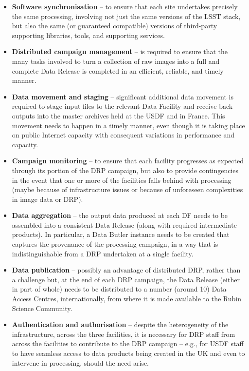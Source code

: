 \begin{itemize}

\item {\bf Software synchronisation} -- to ensure that each site undertakes precisely the same processing, involving not just the same versions of the LSST stack, but also the same (or guaranteed compatible) versions of third-party supporting libraries, tools, and supporting services.

\item {\bf Distributed campaign management} -- is required to ensure that the many tasks involved to turn a collection of raw images into a full and complete Data Release is completed in an efficient, reliable, and timely manner.

\item {\bf Data movement and staging} -- significant additional data movement is required to stage input files to the relevant Data Facility and receive back outputs into the master archives held at the USDF and in France. This movement needs to happen in a timely manner, even though it is taking place on public Internet capacity with consequent variations in performance and capacity.

\item {\bf Campaign monitoring} -- to ensure that each facility progresses as expected through its portion of the DRP campaign, but also to provide contingencies in the event that one or more of the facilities falls behind with processing (maybe because of infrastructure issues or because of unforeseen complexities in image data or DRP).
  
\item {\bf Data aggregation} -- the output data produced at each DF needs to be assembled into a consistent Data Release (along with required intermediate products). In particular, a Data Butler instance needs to be created that captures the provenance of the processing campaign, in a way that is indistinguishable from a DRP undertaken at a single facility.
  
\item {\bf Data publication} -- possibly an advantage of distributed DRP, rather than a challenge but, at the end of each DRP campaign, the Data Release (either in part of whole) needs to be distributed to a number (around 10) Data Access Centres, internationally, from where it is made available to the Rubin Science Community.

\item {\bf Authentication and authorisation} -- despite the heterogeneity of the infrastructure, across the three facilities, it is necessary for DRP staff from across the facilities to contribute to the DRP campaign – e.g., for USDF staff to have seamless access to data products being created in the UK and even to intervene in processing, should the need arise.


\end{itemize}
